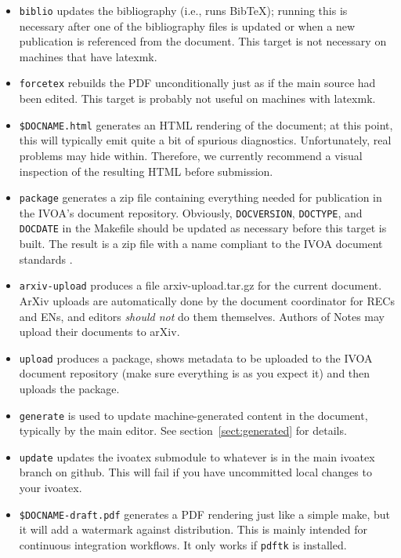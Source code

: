 \documentclass[11pt,a4paper]{ivoa}
\newcommand{\BibTeX}{Bib\TeX}
\begin{document}
\begin{itemize}
\item \texttt{biblio} updates the bibliography (i.e., runs \BibTeX);
running this is necessary after one of the bibliography files is updated
or when a new publication is referenced from the document.  This target
is not necessary on machines that have latexmk.
\item \texttt{forcetex} rebuilds the PDF unconditionally just as if the
main source had been edited.  This target is probably not useful on
machines with latexmk.
\item \texttt{\$DOCNAME.html} generates an HTML rendering of the
document; at this point, this will typically emit quite a bit of
spurious diagnostics.  Unfortunately, real problems may hide within.
Therefore, we currently recommend a visual inspection of the resulting
HTML before submission.
\item \texttt{package} generates a zip file containing everything needed
for publication in the IVOA's document repository.   Obviously,
\texttt{DOCVERSION}, \texttt{DOCTYPE}, and \texttt{DOCDATE} in the
Makefile should be updated as necessary before this target is built.
The result is a zip file with a name compliant to the IVOA document
standards \citep{2017ivoa.spec.0517G}.
\item \texttt{arxiv-upload}  produces a file arxiv-upload.tar.gz for
the current document.  ArXiv uploads are automatically done by the
document coordinator for RECs and ENs, and editors \emph{should not} do
them themselves.  Authors of Notes may upload their documents to arXiv.
\item \texttt{upload} produces a package, shows metadata to be uploaded to the
IVOA document repository (make sure everything is as you expect it) and
then uploads the package.
\item \texttt{generate} is used to update machine-generated content in
the document, typically by the main editor.  See
section~\ref{sect:generated} for details.
\item \texttt{update} updates the ivoatex submodule to whatever is in
the main ivoatex branch on github.  This will fail if you have
uncommitted local changes to your ivoatex.
\item \texttt{\$DOCNAME-draft.pdf} generates a PDF rendering just like a
simple make, but it will add a watermark against distribution.  This is
mainly intended for continuous integration workflows.  It only works
if \verb|pdftk| is installed.
\end{itemize}
\end{document}
